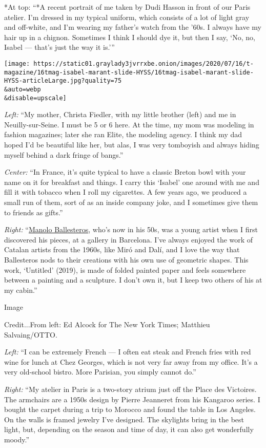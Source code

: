 *At top: ``*A recent portrait of me taken by Dudi Hasson in front of our
Paris atelier. I'm dressed in my typical uniform, which consists of a
lot of light gray and off-white, and I'm wearing my father's watch from
the '60s. I always have my hair up in a chignon. Sometimes I think I
should dye it, but then I say, `No, no, Isabel --- that's just the way
it is.'''

\texttt{[image: https://static01.graylady3jvrrxbe.onion/images/2020/07/16/t-magazine/16tmag-isabel-marant-slide-HYSS/16tmag-isabel-marant-slide-HYSS-articleLarge.jpg?quality=75\\\&auto=webp\\\&disable=upscale]}

\emph{Left:} ``My mother, Christa Fiedler, with my little brother (left)
and me in Neuilly-sur-Seine. I must be 5 or 6 here. At the time, my mom
was modeling in fashion magazines; later she ran Elite, the modeling
agency. I think my dad hoped I'd be beautiful like her, but alas, I was
very tomboyish and always hiding myself behind a dark fringe of bangs.''

\emph{Center:} ``In France, it's quite typical to have a classic Breton
bowl with your name on it for breakfast and things. I carry this
`Isabel' one around with me and fill it with tobacco when I roll my
cigarettes. A few years ago, we produced a small run of them, sort of as
an inside company joke, and I sometimes give them to friends as gifts.''

\emph{Right:} ``\href{https://www.manoloballesteros.com/}{Manolo
Ballesteros}, who's now in his 50s, was a young artist when I first
discovered his pieces, at a gallery in Barcelona. I've always enjoyed
the work of Catalan artists from the 1960s, like Miró and Dalí, and I
love the way that Ballesteros nods to their creations with his own use
of geometric shapes. This work, `Untitled' (2019), is made of folded
painted paper and feels somewhere between a painting and a sculpture. I
don't own it, but I keep two others of his at my cabin.''

Image

Credit...From left: Ed Alcock for The New York Times; Matthieu
Salvaing/OTTO.

\emph{Left:} ``I can be extremely French --- I often eat steak and
French fries with red wine for lunch at Chez Georges, which is not very
far away from my office. It's a very old-school bistro. More Parisian,
you simply cannot do.''

\emph{Right:} ``My atelier in Paris is a two-story atrium just off the
Place des Victoires. The armchairs are a 1950s design by Pierre
Jeanneret from his Kangaroo series. I bought the carpet during a trip to
Morocco and found the table in Los Angeles. On the walls is framed
jewelry I've designed. The skylights bring in the best light, but,
depending on the season and time of day, it can also get wonderfully
moody.''

